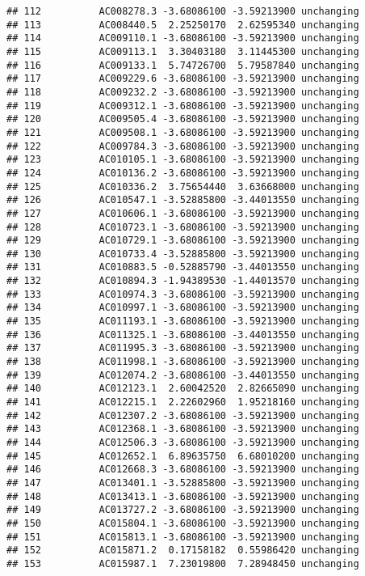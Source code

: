 \documentclass[]{article}
\begin{document}
\begin{verbatim}
## 112          AC008278.3 -3.68086100 -3.59213900 unchanging
## 113          AC008440.5  2.25250170  2.62595340 unchanging
## 114          AC009110.1 -3.68086100 -3.59213900 unchanging
## 115          AC009113.1  3.30403180  3.11445300 unchanging
## 116          AC009133.1  5.74726700  5.79587840 unchanging
## 117          AC009229.6 -3.68086100 -3.59213900 unchanging
## 118          AC009232.2 -3.68086100 -3.59213900 unchanging
## 119          AC009312.1 -3.68086100 -3.59213900 unchanging
## 120          AC009505.4 -3.68086100 -3.59213900 unchanging
## 121          AC009508.1 -3.68086100 -3.59213900 unchanging
## 122          AC009784.3 -3.68086100 -3.59213900 unchanging
## 123          AC010105.1 -3.68086100 -3.59213900 unchanging
## 124          AC010136.2 -3.68086100 -3.59213900 unchanging
## 125          AC010336.2  3.75654440  3.63668000 unchanging
## 126          AC010547.1 -3.52885800 -3.44013550 unchanging
## 127          AC010606.1 -3.68086100 -3.59213900 unchanging
## 128          AC010723.1 -3.68086100 -3.59213900 unchanging
## 129          AC010729.1 -3.68086100 -3.59213900 unchanging
## 130          AC010733.4 -3.52885800 -3.59213900 unchanging
## 131          AC010883.5 -0.52885790 -3.44013550 unchanging
## 132          AC010894.3 -1.94389530 -1.44013570 unchanging
## 133          AC010974.3 -3.68086100 -3.59213900 unchanging
## 134          AC010997.1 -3.68086100 -3.59213900 unchanging
## 135          AC011193.1 -3.68086100 -3.59213900 unchanging
## 136          AC011325.1 -3.68086100 -3.44013550 unchanging
## 137          AC011995.3 -3.68086100 -3.59213900 unchanging
## 138          AC011998.1 -3.68086100 -3.59213900 unchanging
## 139          AC012074.2 -3.68086100 -3.44013550 unchanging
## 140          AC012123.1  2.60042520  2.82665090 unchanging
## 141          AC012215.1  2.22602960  1.95218160 unchanging
## 142          AC012307.2 -3.68086100 -3.59213900 unchanging
## 143          AC012368.1 -3.68086100 -3.59213900 unchanging
## 144          AC012506.3 -3.68086100 -3.59213900 unchanging
## 145          AC012652.1  6.89635750  6.68010200 unchanging
## 146          AC012668.3 -3.68086100 -3.59213900 unchanging
## 147          AC013401.1 -3.52885800 -3.59213900 unchanging
## 148          AC013413.1 -3.68086100 -3.59213900 unchanging
## 149          AC013727.2 -3.68086100 -3.59213900 unchanging
## 150          AC015804.1 -3.68086100 -3.59213900 unchanging
## 151          AC015813.1 -3.68086100 -3.59213900 unchanging
## 152          AC015871.2  0.17158182  0.55986420 unchanging
## 153          AC015987.1  7.23019800  7.28948450 unchanging

\end{verbatim}
\end{document}
